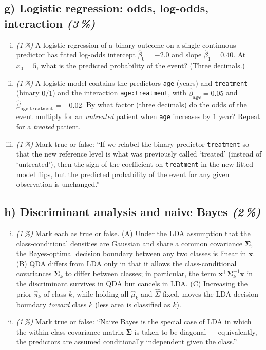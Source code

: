 \documentclass[11pt,a4paper]{article}
\newcommand{\subpoints}[1]{\textit{(#1\,\%)}}
\begin{document}
\subsection*{g) Logistic regression: odds, log-odds, interaction \subpoints{3}}

\begin{enumerate}[(i)]
  \item \subpoints{1} A logistic regression of a binary outcome on a single continuous predictor has fitted log-odds intercept $\hat\beta_0 = -2.0$ and slope $\hat\beta_1 = 0.40$. At $x_0 = 5$, what is the predicted probability of the event? (Three decimals.)
  \item \subpoints{1} A logistic model contains the predictors \texttt{age} (years) and \texttt{treatment} (binary $0/1$) and the interaction \texttt{age:treatment}, with $\hat\beta_{\texttt{age}} = 0.05$ and $\hat\beta_{\texttt{age:treatment}} = -0.02$. By what factor (three decimals) do the odds of the event multiply for an \emph{untreated} patient when \texttt{age} increases by $1$ year? Repeat for a \emph{treated} patient.
  \item \subpoints{1} Mark true or false: ``If we relabel the binary predictor \texttt{treatment} so that the new reference level is what was previously called `treated' (instead of `untreated'), then the sign of the coefficient on \texttt{treatment} in the new fitted model flips, but the predicted probability of the event for any given observation is unchanged.''
\end{enumerate}

\subsection*{h) Discriminant analysis and naive Bayes \subpoints{2}}
\begin{enumerate}[(i)]
  \item \subpoints{1} Mark each as true or false. (A) Under the LDA assumption that the class-conditional densities are Gaussian and share a common covariance $\boldsymbol\Sigma$, the Bayes-optimal decision boundary between any two classes is linear in $\mathbf x$. (B) QDA differs from LDA only in that it allows the class-conditional covariances $\boldsymbol\Sigma_k$ to differ between classes; in particular, the term $\mathbf x^\top \boldsymbol\Sigma_k^{-1} \mathbf x$ in the discriminant survives in QDA but cancels in LDA. (C) Increasing the prior $\hat\pi_k$ of class $k$, while holding all $\hat\mu_k$ and $\hat\Sigma$ fixed, moves the LDA decision boundary \emph{toward} class $k$ (less area is classified as $k$).
  \item \subpoints{1} Mark true or false: ``Naive Bayes is the special case of LDA in which the within-class covariance matrix $\boldsymbol\Sigma$ is taken to be diagonal --- equivalently, the predictors are assumed conditionally independent given the class.''
\end{enumerate}
\end{document}
